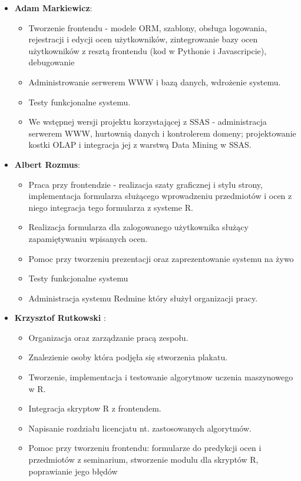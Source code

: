 \documentclass[licencjacka]{pracamgr}
\begin{document}
\begin{itemize}
\item \textbf{Adam Markiewicz}:
	\begin{itemize}
	        \item Tworzenie frontendu - modele ORM, szablony, obsługa logowania, rejestracji i edycji ocen użytkowników, zintegrowanie bazy ocen użytkowników z resztą frontendu (kod w Pythonie i Javascripcie), debugowanie
	        \item Administrowanie serwerem WWW i bazą danych, wdrożenie systemu.
	        \item Testy funkcjonalne systemu.
	        \item We wstępnej wersji projektu korzystającej z SSAS - administracja serwerem WWW, hurtownią danych i kontrolerem domeny; projektowanie kostki OLAP i integracja jej z warstwą Data Mining w SSAS.
	    \end{itemize}
\item \textbf{Albert Rozmus}:
  \begin{itemize}
        \item Praca przy frontendzie - realizacja szaty graficznej i stylu strony,
		      implementacja formularza służącego wprowadzeniu przedmiotów i ocen z niego 
			  integracja tego formularza z systeme R.
	    \item Realizacja formularza dla zalogowanego użytkownika służący zapamiętywaniu wpisanych ocen.
        \item Pomoc przy tworzeniu prezentacji oraz zaprezentowanie systemu na żywo
        \item Testy funkcjonalne systemu
        \item Administracja systemu Redmine który służył organizacji pracy.
    \end{itemize}
\item \textbf{Krzysztof Rutkowski} :
    \begin{itemize}
        \item Organizacja oraz zarządzanie pracą zespołu.
        \item Znalezienie osoby która podjęła się stworzenia plakatu.
        \item Tworzenie, implementacja i testowanie algorytmow uczenia maszynowego w R.
        \item Integracja skryptow R z frontendem.
		\item Napisanie rozdziału licencjatu nt. zastosowanych algorytmów.
        \item Pomoc przy tworzeniu frontendu: formularze do predykcji ocen i przedmiotów z seminarium, stworzenie modulu dla skryptów R, poprawianie jego błędów

\end{itemize}
\end{itemize}
\end{document}
